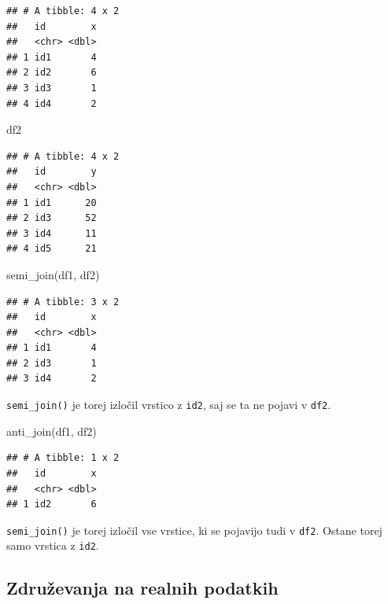 \documentclass[
]{book}
\newenvironment{Shaded}{\begin{snugshade}}{\end{snugshade}}
\newcommand{\FunctionTok}[1]{\textcolor[rgb]{0.00,0.00,0.00}{#1}}
\newcommand{\NormalTok}[1]{#1}
\begin{document}
\begin{verbatim}
## # A tibble: 4 x 2
##   id        x
##   <chr> <dbl>
## 1 id1       4
## 2 id2       6
## 3 id3       1
## 4 id4       2
\end{verbatim}

\begin{Shaded}
\begin{Highlighting}[]
\NormalTok{df2}
\end{Highlighting}
\end{Shaded}

\begin{verbatim}
## # A tibble: 4 x 2
##   id        y
##   <chr> <dbl>
## 1 id1      20
## 2 id3      52
## 3 id4      11
## 4 id5      21
\end{verbatim}

\begin{Shaded}
\begin{Highlighting}[]
\FunctionTok{semi\_join}\NormalTok{(df1, df2)}
\end{Highlighting}
\end{Shaded}

\begin{verbatim}
## # A tibble: 3 x 2
##   id        x
##   <chr> <dbl>
## 1 id1       4
## 2 id3       1
## 3 id4       2
\end{verbatim}

\texttt{semi\_join()} je torej izločil vrstico z \texttt{id2}, saj se ta ne pojavi v \texttt{df2}.

\begin{Shaded}
\begin{Highlighting}[]
\FunctionTok{anti\_join}\NormalTok{(df1, df2)}
\end{Highlighting}
\end{Shaded}

\begin{verbatim}
## # A tibble: 1 x 2
##   id        x
##   <chr> <dbl>
## 1 id2       6
\end{verbatim}

\texttt{semi\_join()} je torej izločil vse vrstice, ki se pojavijo tudi v \texttt{df2}. Ostane torej samo vrstica z \texttt{id2}.

\hypertarget{zdruux17eevanja-na-realnih-podatkih}{%
\subsection{Združevanja na realnih podatkih}\label{zdruux17eevanja-na-realnih-podatkih}}
\end{document}
